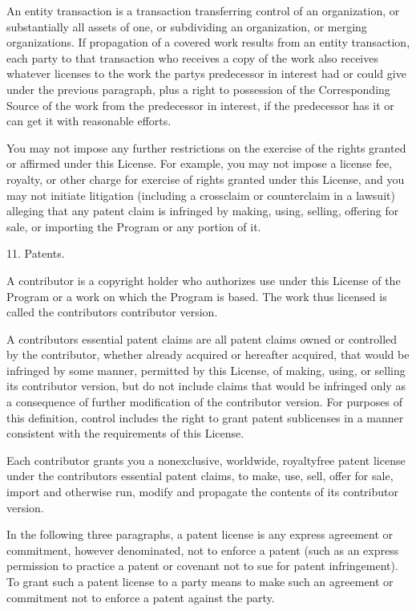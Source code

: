 \documentclass[letterpaper,10pt,english]{sphinxmanual}
\begin{document}
\begin{sphinxVerbatim}[commandchars=\\\{\}]
  An \PYGZdq{}entity transaction\PYGZdq{} is a transaction transferring control of an
organization, or substantially all assets of one, or subdividing an
organization, or merging organizations.  If propagation of a covered
work results from an entity transaction, each party to that
transaction who receives a copy of the work also receives whatever
licenses to the work the party\PYGZsq{}s predecessor in interest had or could
give under the previous paragraph, plus a right to possession of the
Corresponding Source of the work from the predecessor in interest, if
the predecessor has it or can get it with reasonable efforts.

  You may not impose any further restrictions on the exercise of the
rights granted or affirmed under this License.  For example, you may
not impose a license fee, royalty, or other charge for exercise of
rights granted under this License, and you may not initiate litigation
(including a cross\PYGZhy{}claim or counterclaim in a lawsuit) alleging that
any patent claim is infringed by making, using, selling, offering for
sale, or importing the Program or any portion of it.

  11. Patents.

  A \PYGZdq{}contributor\PYGZdq{} is a copyright holder who authorizes use under this
License of the Program or a work on which the Program is based.  The
work thus licensed is called the contributor\PYGZsq{}s \PYGZdq{}contributor version\PYGZdq{}.

  A contributor\PYGZsq{}s \PYGZdq{}essential patent claims\PYGZdq{} are all patent claims
owned or controlled by the contributor, whether already acquired or
hereafter acquired, that would be infringed by some manner, permitted
by this License, of making, using, or selling its contributor version,
but do not include claims that would be infringed only as a
consequence of further modification of the contributor version.  For
purposes of this definition, \PYGZdq{}control\PYGZdq{} includes the right to grant
patent sublicenses in a manner consistent with the requirements of
this License.

  Each contributor grants you a non\PYGZhy{}exclusive, worldwide, royalty\PYGZhy{}free
patent license under the contributor\PYGZsq{}s essential patent claims, to
make, use, sell, offer for sale, import and otherwise run, modify and
propagate the contents of its contributor version.

  In the following three paragraphs, a \PYGZdq{}patent license\PYGZdq{} is any express
agreement or commitment, however denominated, not to enforce a patent
(such as an express permission to practice a patent or covenant not to
sue for patent infringement).  To \PYGZdq{}grant\PYGZdq{} such a patent license to a
party means to make such an agreement or commitment not to enforce a
patent against the party.


\end{sphinxVerbatim}
\end{document}
